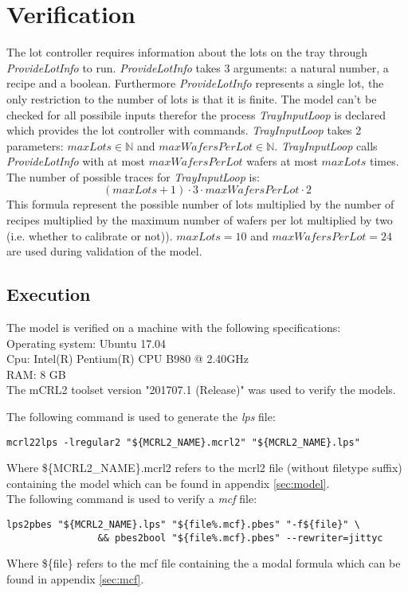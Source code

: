 \section{Verification}\label{sec:results}
The lot controller requires information about the lots on the tray through \textit{ProvideLotInfo} to run. \textit{ProvideLotInfo} takes 3 arguments: a natural number, a recipe and a boolean. Furthermore \textit{ProvideLotInfo} represents a single lot, the only restriction to the number of lots is that it is finite. The model can't be checked for all possibile inputs therefor the process \textit{TrayInputLoop} is declared which provides the lot controller with  commands. \textit{TrayInputLoop} takes 2 parameters: $\mathit{maxLots} \in \mathbb{N}$ and $\mathit{maxWafersPerLot} \in \mathbb{N}$. \textit{TrayInputLoop} calls \textit{ProvideLotInfo} with at most $\mathit{maxWafersPerLot}$ wafers at most $\mathit{maxLots}$ times. The number of possible traces for \textit{TrayInputLoop} is:
$$(\mathit{maxLots}+1) \cdot 3 \cdot \mathit{maxWafersPerLot} \cdot 2$$
This formula represent the possible number of lots multiplied by the number of recipes multiplied by the maximum number of wafers per lot multiplied by two (i.e. whether to calibrate or not)). $\mathit{maxLots} = 10$ and $\mathit{maxWafersPerLot} = 24$ are used during validation of the model.

\subsection{Execution}
The model is verified on a machine with the following specifications:\\
Operating system: Ubuntu 17.04\\
Cpu: Intel(R) Pentium(R) CPU B980 @ 2.40GHz\\
RAM: 8 GB\\

The mCRL2 toolset version "201707.1 (Release)" was used to verify the models.

The following command is used to generate the \textit{lps} file:\\
\begin{lstlisting}[frame=single,caption={mcf2lps}]
mcrl22lps -lregular2 "${MCRL2_NAME}.mcrl2" "${MCRL2_NAME}.lps"
\end{lstlisting}
Where \$\{MCRL2\_NAME\}.mcrl2 refers to the mcrl2 file (without filetype suffix) containing the model which can be found in appendix \ref{sec:model}.\\
The following command is used to verify a \textit{mcf} file:\\
\begin{lstlisting}[frame=single,caption={mcf check}] 
lps2pbes "${MCRL2_NAME}.lps" "${file%.mcf}.pbes" "-f${file}" \
                && pbes2bool "${file%.mcf}.pbes" --rewriter=jittyc
\end{lstlisting}
Where \$\{file\} refers to the mcf file containing the a modal formula which can be found in appendix \ref{sec:mcf}.\\

